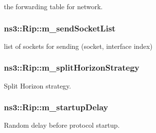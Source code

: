 the forwarding table for network. 

\subsubsection[{\texorpdfstring{m\+\_\+send\+Socket\+List}{m_sendSocketList}}]{ ns3\+::\+Rip\+::m\+\_\+send\+Socket\+List\hspace{0.3cm}{\ttfamily [private]}}\hypertarget{classns3_1_1Rip_a58b5f6ebcee2ed04249fd025abfa61cb}{}\label{classns3_1_1Rip_a58b5f6ebcee2ed04249fd025abfa61cb}


list of sockets for sending (socket, interface index) 

\subsubsection[{\texorpdfstring{m\+\_\+split\+Horizon\+Strategy}{m_splitHorizonStrategy}}]{ ns3\+::\+Rip\+::m\+\_\+split\+Horizon\+Strategy\hspace{0.3cm}{\ttfamily [private]}}\hypertarget{classns3_1_1Rip_a2053001529a46356e1f612dfde6b4faf}{}\label{classns3_1_1Rip_a2053001529a46356e1f612dfde6b4faf}


Split Horizon strategy. 

\subsubsection[{\texorpdfstring{m\+\_\+startup\+Delay}{m_startupDelay}}]{ ns3\+::\+Rip\+::m\+\_\+startup\+Delay\hspace{0.3cm}{\ttfamily [private]}}\hypertarget{classns3_1_1Rip_a26dfd4f6ce345b6259733027a77fbcc9}{}\label{classns3_1_1Rip_a26dfd4f6ce345b6259733027a77fbcc9}


Random delay before protocol startup. 

